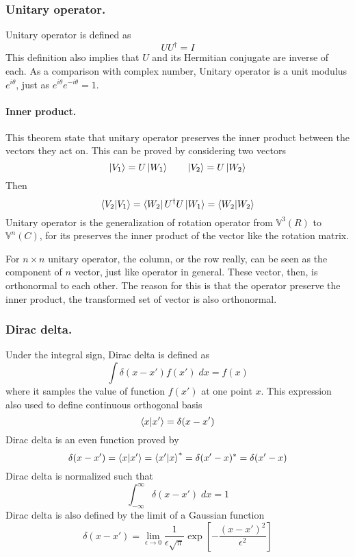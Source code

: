 \documentclass[../main.tex]{subfiles}
\begin{document}
\subsubsection{Unitary operator.}
Unitary operator is defined as
\begin{equation*}
	UU ^\dagger=I
\end{equation*}
This definition also implies that $U$ and its Hermitian conjugate are inverse of each.
As a comparison with complex number, Unitary operator is a unit modulus $e^{i\theta}$, just as $e^{i\theta}e^{-i\theta}=1$.

\paragraph*{Inner product.} This theorem state that unitary operator preserves the inner product between the vectors they act on.
This can be proved by considering two vectors
\begin{equation*}
	\ket{V_1}=U \ket{W_1}\qquad \ket{V_2}=U \ket{W_2}
\end{equation*}
Then
\begin{equation*}
	\braket{V_2|V_1}=\bra{W_2}U ^\dagger U \ket{W_1}=\braket{W_2|W_2}
\end{equation*}
Unitary operator is the generalization of rotation operator from $\mathbb{V}^3(R)$ to $\mathbb{V}^n(C)$, for its preserves the inner product of the vector like the rotation matrix.

For $n\times n$ unitary operator, the column, or the row really, can be seen as the component of $n$ vector, just like operator in general.
These vector, then, is orthonormal to each other.
The reason for this is that the operator preserve the inner product, the transformed set of vector is also orthonormal.

\subsubsection{Dirac delta.}
Under the integral sign, Dirac delta is defined as
\begin{equation*}
	\int \delta(x-x')f(x')\;dx=f(x)
\end{equation*}
where it samples the value of function $f(x')$ at one point $x$.
This expression also used to define continuous orthogonal basis
\begin{equation*}
	\braket{x|x'}=\delta(x-x')
\end{equation*}
Dirac delta is an even function proved by
\begin{equation*}
	\delta(x-x')=\braket{x|x'}=\braket{x'|x}^*=\delta(x'-x)^*=\delta(x'-x)
\end{equation*}
Dirac delta is normalized such that
\begin{equation*}
	\int_{-\infty}^{\infty}\delta(x-x')\;dx=1
\end{equation*}
Dirac delta is also defined by the limit of a Gaussian function
\begin{equation*}
	\delta (x-x')=\lim_{\epsilon \rightarrow 0}\frac{1}{\epsilon \sqrt{\pi}}\exp\left[-\frac{(x-x')^2 }{\epsilon^2}\right]
\end{equation*}
\end{document}
